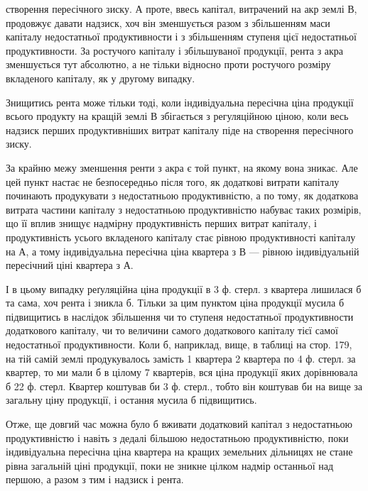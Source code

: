 \parcont{}  %
створення пересічного зиску. А проте, ввесь капітал, витрачений на акр землі В,
продовжує давати надзиск, хоч він зменшується разом з збільшенням маси капіталу
недостатньої продуктивности і з збільшенням ступеня цієї недостатньої
продуктивности. За ростучого капіталу і збільшуваної продукції, рента з акра
зменшується тут абсолютно, а не тільки відносно проти ростучого розміру вкладеного
капіталу, як у другому випадку.

Знищитись рента може тільки тоді, коли індивідуальна пересічна ціна
продукції всього продукту на кращій землі В збігається з регуляційною ціною,
коли весь надзиск перших продуктивніших витрат капіталу піде на створення
пересічного зиску.

За крайню межу зменшення ренти з акра є той пункт, на якому вона
зникає. Але цей пункт настає не безпосередньо після того, як додаткові витрати
капіталу починають продукувати з недостатньою продуктивністю, а по тому, як
додаткова витрата частини капіталу з недостатньою продуктивністю набуває таких
розмірів, що її вплив знищує надмірну продуктивність перших витрат капіталу,
і продуктивність усього вкладеного капіталу стає рівною продуктивності капіталу
на А, а тому індивідуальна пересічна ціна квартера з В — рівною індивідуальній
пересічний ціні квартера з А.

І в цьому випадку реґуляційна ціна продукції в 3 ф. стерл. з квартера
лишилася б та сама, хоч рента і зникла б. Тільки за цим пунктом ціна продукції
мусила б підвищитись в наслідок збільшення чи то ступеня недостатньої
продуктивности додаткового капіталу, чи то величини самого додаткового
капіталу тієї самої недостатньої продуктивности. Коли б, наприклад, вище, в таблиці
на стор. 179, на тій самій землі продукувалось замість 1 квартера 2 квартера
по 4 ф. стерл. за квартер, то ми мали б в цілому 7 квартерів, вся ціна
продукції яких дорівнювала б 22 ф. стерл. Квартер коштував би 3 ф. стерл.,
тобто він коштував би на  вище за загальну ціну продукції, і остання
мусила б підвищитись.

Отже, ще довгий час можна було б вживати додатковий капітал з недостатньою
продуктивністю і навіть з дедалі більшою недостатньою продуктивністю,
поки індивідуальна пересічна ціна квартера на кращих земельних дільницях
не стане рівна загальній ціні продукції, поки не зникне цілком надмір останньої
над першою, а разом з тим і надзиск і рента.

